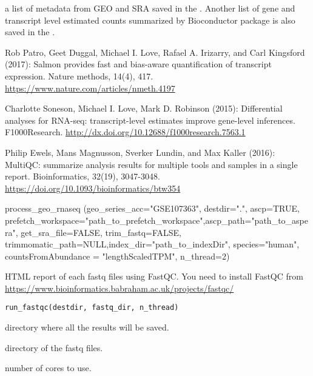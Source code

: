 \documentclass[letterpaper]{book}
\begin{document}
%
\begin{Value}
a list of metadata from GEO and SRA saved in the . Another list of gene and transcript level estimated counts summarized by 
Bioconductor package  is also saved in the .
\end{Value}
%
\begin{References}\relax
Rob Patro, Geet Duggal, Michael I. Love, Rafael A. Irizarry, and Carl Kingsford (2017):
Salmon provides fast and bias-aware quantification of transcript expression. Nature methods, 14(4), 417.
\url{https://www.nature.com/articles/nmeth.4197}

Charlotte Soneson, Michael I. Love, Mark D. Robinson (2015):
Differential analyses for RNA-seq: transcript-level estimates
improve gene-level inferences. F1000Research.
\url{http://dx.doi.org/10.12688/f1000research.7563.1}

Philip Ewels, Mans Magnusson, Sverker Lundin, and Max Kaller (2016):
MultiQC: summarize analysis results for multiple tools and samples 
in a single report. Bioinformatics, 32(19), 3047-3048.
\url{https://doi.org/10.1093/bioinformatics/btw354}
\end{References}
%
\begin{Examples}
\begin{ExampleCode}
process_geo_rnaseq (geo_series_acc="GSE107363", destdir=".", ascp=TRUE, 
prefetch_workspace="path_to_prefetch_workspace",ascp_path="path_to_aspera",
get_sra_file=FALSE, trim_fastq=FALSE, trimmomatic_path=NULL,index_dir="path_to_indexDir",
species="human", countsFromAbundance = "lengthScaledTPM", n_thread=2)

\end{ExampleCode}
\end{Examples}
%
\begin{Description}\relax
{} HTML report of each fastq files using FastQC. You need to install FastQC from \url{https://www.bioinformatics.babraham.ac.uk/projects/fastqc/}
\end{Description}
%
\begin{Usage}
\begin{verbatim}
run_fastqc(destdir, fastq_dir, n_thread)
\end{verbatim}
\end{Usage}
%
\begin{Arguments}
\begin{ldescription}
\item[\code{destdir}] directory where all the results will be saved.

\item[\code{fastq\_dir}] directory of the fastq files.

\item[\code{n\_thread}] number of cores to use.
\end{ldescription}
\end{Arguments}
\end{document}
